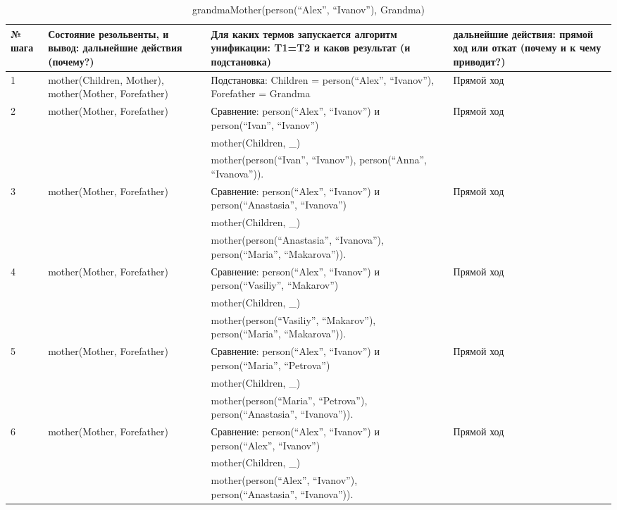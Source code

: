 {
\small
\begin{longtable}{|p{1.15cm}|p{4cm}|p{6cm}|p{6cm}|}
    \caption{grandmaMother(person(``Alex'', ``Ivanov''), Grandma)} \\
    \hline
    № шага & Состояние резольвенты, и вывод: дальнейшие действия (почему?) & Для каких термов запускается алгоритм унификации: T1=T2 и каков результат (и подстановка) & дальнейшие действия: прямой ход или откат (почему и к чему приводит?) \\
    \hline
    1 & mother(Children, Mother), mother(Mother, Forefather) & Подстановка: Children = person(``Alex'', ``Ivanov''), Forefather = Grandma & Прямой ход \\
    \hline
    2 & mother(Mother, Forefather) & Сравнение: person(``Alex'', ``Ivanov'') и person(``Ivan'', ``Ivanov'') & Прямой ход \\
      & & mother(Children, \_) & \\
      & & mother(person(``Ivan'', ``Ivanov''), person(``Anna'', ``Ivanova'')). & \\
    \hline
    3 & mother(Mother, Forefather) & Сравнение: person(``Alex'', ``Ivanov'') и person(``Anastasia'', ``Ivanova'') & Прямой ход \\
      & & mother(Children, \_) & \\
      & & mother(person(``Anastasia'', ``Ivanova''), person(``Maria'', ``Makarova'')). & \\
    \hline
    4 & mother(Mother, Forefather) & Сравнение: person(``Alex'', ``Ivanov'') и person(``Vasiliy'', ``Makarov'') & Прямой ход \\
      & & mother(Children, \_) & \\
      & & mother(person(``Vasiliy'', ``Makarov''), person(``Maria'', ``Makarova'')). & \\
    \hline
    5 & mother(Mother, Forefather) & Сравнение: person(``Alex'', ``Ivanov'') и person(``Maria'', ``Petrova'') & Прямой ход \\
      & & mother(Children, \_) & \\
      & & mother(person(``Maria'', ``Petrova''), person(``Anastasia'', ``Ivanova'')). & \\
    \hline
    6 & mother(Mother, Forefather) & Сравнение: person(``Alex'', ``Ivanov'') и person(``Alex'', ``Ivanov'') & Прямой ход \\
      & & mother(Children, \_) & \\
      & & mother(person(``Alex'', ``Ivanov''), person(``Anastasia'', ``Ivanova'')). & \\

\end{longtable}}
